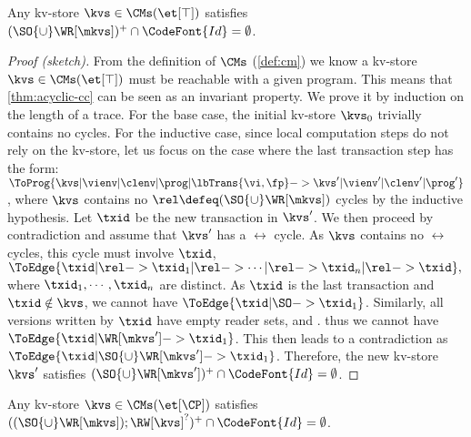 \begin{theorem}
\label{thm:acyclic-cc}
Any kv-store \( \kvs \in \CMs(\et[\top]) \) satisfies \( (\SO {\cup} \WR[\mkvs])^{+} \cap \CodeFont{Id} = \emptyset \).
\end{theorem}

\begin{proof}[Proof (sketch)]
From the definition of \( \CMs \) (\cref{def:cm})
we know a kv-store \( \kvs \in \CMs(\et[\top]) \) must be reachable with a given program.
This means that \cref{thm:acyclic-cc} can be seen as an invariant property.
We prove it by induction on the length of a trace.
For the base case, the initial kv-store \( \kvs_0 \) trivially contains no cycles.
For the inductive case, since local computation steps do not rely on the kv-store,
let us focus on the case where the last transaction step has the form:
\( \ToProg{\kvs | \vienv | \clenv | \prog | \lbTrans{\vi,\fp} -> \kvs' | \vienv' | \clenv' | \prog' } \),
where \( \kvs \) contains no \(\rel \defeq (\SO {\cup} \WR[\mkvs]) \) cycles by the inductive hypothesis.
Let \( \txid \) be the new transaction in \( \kvs' \).
We then proceed by contradiction and assume that \( \kvs' \) has a $\rel$ cycle.
As $\kvs$ contains no $\rel$ cycles, this cycle must involve  \( \txid \), \ie
\(
\ToEdge{\txid | \rel -> \txid_1 | \rel -> \cdots | \rel -> \txid_n | \rel -> \txid}, 
\)
where  \( \txid_1, \cdots,  \txid_n \) are distinct.
As \( \txid \) is the last transaction and \( \txid \notin \kvs\),
we cannot have \( \ToEdge{\txid | \SO -> \txid_1} \).
Similarly, all versions written by \( \txid \) have empty reader sets, and .
thus we cannot have \( \ToEdge{\txid | \WR[\mkvs'] -> \txid_1} \).
This then leads to a contradiction as \( \ToEdge{\txid | {\SO {\cup} \WR[\mkvs']} -> \txid_1} \).
Therefore, the new kv-store \( \kvs' \) satisfies \( (\SO {\cup} \WR[\mkvs'])^{+} \cap \CodeFont{Id} = \emptyset \).
\renewcommand{\qed}{}
\end{proof}
\SpaceAboveDef
\begin{theorem}
\label{thm:acyclic-cp}
Any kv-store \( \kvs \in \CMs(\et[\CP]) \) satisfies \( ((\SO {\cup} \WR[\mkvs]) ; \RW[\kvs]^? )^{+}  \cap \CodeFont{Id} = \emptyset \).
\end{theorem}
